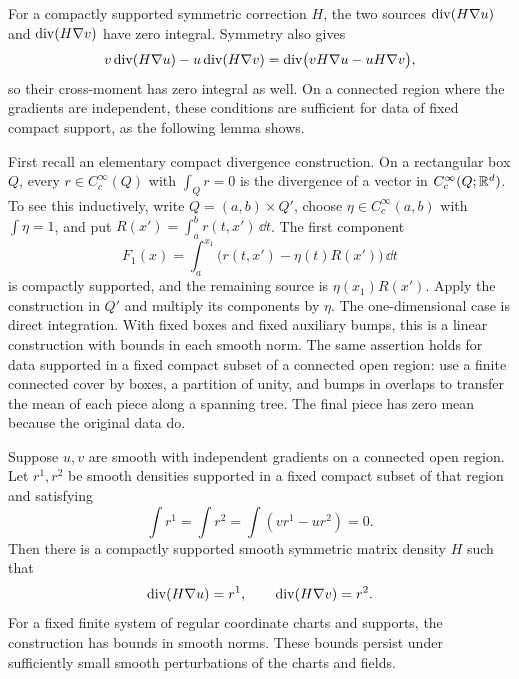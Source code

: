 For a compactly supported symmetric correction $H$, the two sources
$\operatorname{div}(H\nabla u)$ and $\operatorname{div}(H\nabla v)$ have zero integral.  Symmetry
also gives
\begin{equation}\label{bl:torque-divergence}
 v\operatorname{div}(H\nabla u)-u\operatorname{div}(H\nabla v)
   =\operatorname{div}\bigl(vH\nabla u-uH\nabla v\bigr),
\end{equation}
so their cross-moment has zero integral as well.  On a connected region
where the gradients are independent, these conditions are sufficient
for data of fixed compact support, as the following lemma shows.

First recall an elementary compact divergence construction.  On a
rectangular box $Q$, every $r\in C_c^\infty(Q)$ with $\int_Qr=0$ is the
divergence of a vector in $C_c^\infty(Q;\mathbb R^d)$.  To see this inductively,
write $Q=(a,b)\times Q'$, choose $\eta\in C_c^\infty(a,b)$ with
$\int\eta=1$, and put $R(x')=\int_a^b r(t,x')\,\dd t$.  The first
component
\[
 F_1(x)=\int_a^{x_1}\bigl(r(t,x')-\eta(t)R(x')\bigr)\,\dd t
\]
is compactly supported, and the remaining source is $\eta(x_1)R(x')$.
Apply the construction in $Q'$ and multiply its components by $\eta$.
The one-dimensional case is direct integration.  With fixed boxes and
fixed auxiliary bumps, this is a linear construction with bounds in
each smooth norm.  The same assertion holds for data supported in a
fixed compact subset of a connected open region: use a finite connected
cover by boxes, a partition of unity, and bumps in overlaps to transfer
the mean of each piece along a spanning tree.  The final piece has zero
mean because the original data do.

\begin{lemma}\label{bl:regular-correction}
Suppose $u,v$ are smooth with independent gradients on a connected open
region.  Let $r^1,r^2$ be smooth densities supported in a fixed compact
subset of that region and satisfying
\begin{equation}\label{bl:three-moments}
 \int r^1=\int r^2=
 \int(vr^1-ur^2)=0.
\end{equation}
Then there is a compactly supported smooth symmetric matrix density $H$
such that
\begin{equation}\label{bl:correction-equations}
 \operatorname{div}(H\nabla u)=r^1,\qquad \operatorname{div}(H\nabla v)=r^2.
\end{equation}
For a fixed finite system of regular coordinate charts and supports,
the construction has bounds in smooth norms.  These bounds persist
under sufficiently small smooth perturbations of the charts and fields.
\end{lemma}

